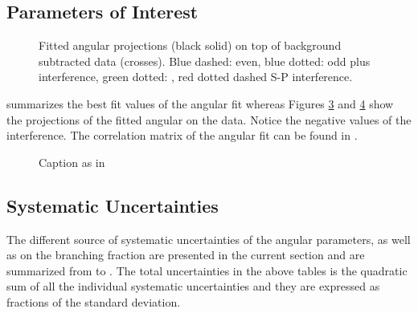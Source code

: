 \subsection{Parameters of Interest}
\label{Parameters_of_Interest}

\begin{figure}[!t]
  \begin{subfigure}{\textwidth}
    \centering
    \scalebox{1.45}{}
    \label{angPlot_ctk}
  \end{subfigure}
  \begin{subfigure}{\textwidth}
    \centering
    \scalebox{1.45}{}
    \label{angPlot_ctl}
  \end{subfigure}
    \caption{Fitted angular \pdf projections (black solid) on top of \BsJpsiKst background subtracted data (crosses).
           Blue dashed: \pwave even, blue dotted: \pwave odd plus interference,
           green dotted: \swave, red dotted dashed S-P interference.}
  \label{angular_plot_thetas}
\end{figure}

 summarizes the best fit values of the angular fit whereas
Figures \ref{angular_plot_thetas} and \ref{angPlot_phi} show the projections of the fitted angular \pdf on the data.
Notice the negative values of the \spwave interference. The correlation matrix of the
angular fit can be found in .

\begin{figure}[!t]
    \centering
    \scalebox{1.45}{}
    \caption{Caption as in }
    \label{angPlot_phi}
\end{figure}

\subsection{Systematic Uncertainties}
\label{systemics}
The different source of systematic uncertainties of the \Bs angular parameters, as well as on the branching fraction
are presented in the current section and are summarized from  to .
The total uncertainties in the above tables is the quadratic sum of all the individual systematic uncertainties and
they are expressed as fractions of the standard deviation.

